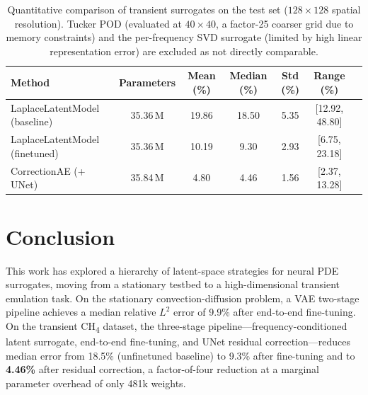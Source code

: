 \documentclass[a4paper]{article}
\begin{document}
\begin{table}[htbp]
    \centering
    \begin{tabular}{lcccccc}
        \toprule
        \textbf{Method} & \textbf{Parameters} & \textbf{Mean (\%)} & \textbf{Median (\%)} & \textbf{Std (\%)} & \textbf{Range (\%)} \\
        \midrule
        LaplaceLatentModel (baseline)     & 35.36\,M & 19.86 & 18.50 & 5.35 & [12.92, 48.80] \\
        LaplaceLatentModel (finetuned)    & 35.36\,M & 10.19 & 9.30  & 2.93 & [6.75, 23.18] \\
        CorrectionAE (+ UNet)             & 35.84\,M & 4.80  & 4.46  & 1.56 & [2.37, 13.28] \\
        \bottomrule
    \end{tabular}
    \caption{Quantitative comparison of transient surrogates on the test set ($128\times128$ spatial resolution). Tucker POD (evaluated at $40\times40$, a factor-25 coarser grid due to memory constraints) and the per-frequency SVD surrogate (limited by high linear representation error) are excluded as not directly comparable.}
    \label{tab:comparison}
\end{table}

\FloatBarrier
\newpage
\section{Conclusion}

This work has explored a hierarchy of latent-space strategies for neural PDE surrogates, moving from a stationary testbed to a high-dimensional transient emulation task. On the stationary convection-diffusion problem, a VAE two-stage pipeline achieves a median relative $L^2$ error of 9.9\% after end-to-end fine-tuning. On the transient CH\textsubscript{4} dataset, the three-stage pipeline—frequency-conditioned latent surrogate, end-to-end fine-tuning, and UNet residual correction—reduces median error from 18.5\% (unfinetuned baseline) to 9.3\% after fine-tuning and to \textbf{4.46\%} after residual correction, a factor-of-four reduction at a marginal parameter overhead of only 481k weights.
\end{document}
